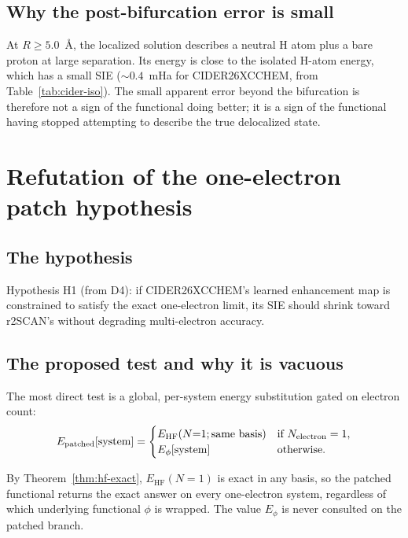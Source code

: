 \documentclass[11pt]{report}
\theoremstyle{definition}
\theoremstyle{remark}
\newcommand{\EHF}{E_{\mathrm{HF}}}
\begin{document}
\subsection{Why the post-bifurcation error is small}

At $R \ge 5.0$~\AA, the localized solution describes a neutral H atom plus
a bare proton at large separation. Its energy is close to the isolated
H-atom energy, which has a small SIE ($\sim 0.4$~mHa for CIDER26XCCHEM,
from Table~\ref{tab:cider-iso}). The small apparent error beyond the
bifurcation is therefore not a sign of the functional doing better; it is a
sign of the functional having stopped attempting to describe the true
delocalized state.

\section{Refutation of the one-electron patch hypothesis}
\label{sec:patch}

\subsection{The hypothesis}

Hypothesis H1 (from D4): if CIDER26XCCHEM's learned enhancement map is
constrained to satisfy the exact one-electron limit, its SIE should shrink
toward r2SCAN's without degrading multi-electron accuracy.

\subsection{The proposed test and why it is vacuous}

The most direct test is a global, per-system energy substitution gated on
electron count:
\begin{equation}
E_{\rm patched}[\text{system}] =
\begin{cases}
\EHF(N{=}1;\text{same basis}) & \text{if } N_{\rm electron} = 1, \\
E_\phi[\text{system}] & \text{otherwise}.
\end{cases}
\label{eq:patch}
\end{equation}

By Theorem~\ref{thm:hf-exact}, $\EHF(N{=}1)$ is exact in any basis, so
the patched functional returns the exact answer on every one-electron
system, regardless of which underlying functional $\phi$ is wrapped. The
value $E_\phi$ is never consulted on the patched branch.
\end{document}
